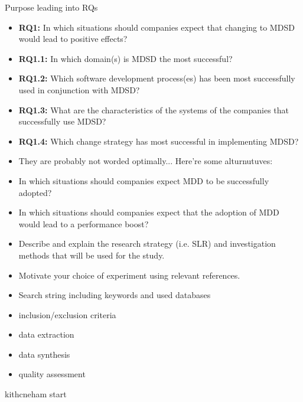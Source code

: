 \documentclass[10pt,twocolumn]{article}
\begin{document}
Purpose leading into RQs

\begin{itemize}
\item \textbf{RQ1:} In which situations should companies expect that changing to MDSD would lead to positive effects? 
\item \textbf{RQ1.1:} In which domain(s) is MDSD the most successful? 
\item \textbf{RQ1.2:} Which software development process(es) has been most successfully used in conjunction with MDSD?
\item \textbf{RQ1.3:} What are the characteristics of the systems of the companies that successfully use MDSD?
\item \textbf{RQ1.4:} Which change strategy has most successful in implementing MDSD? 
\end{itemize}

\begin{itemize}
\item They are probably not worded optimally... Here're some alturnutuves:
\item In which situations should companies expect MDD to be successfully adopted?
\item In which situations should companies expect that the adoption of MDD would lead to a performance boost?
\end{itemize}



\begin{itemize}
\item Describe and explain the research strategy (i.e. SLR) and investigation methods that will be used for the study. 
\item Motivate your choice of experiment using relevant references. 
\item Search string including keywords and used databases
\item inclusion/exclusion criteria
\item data extraction
\item data synthesis
\item quality assessment
\end{itemize}

kithcneham start
\end{document}
